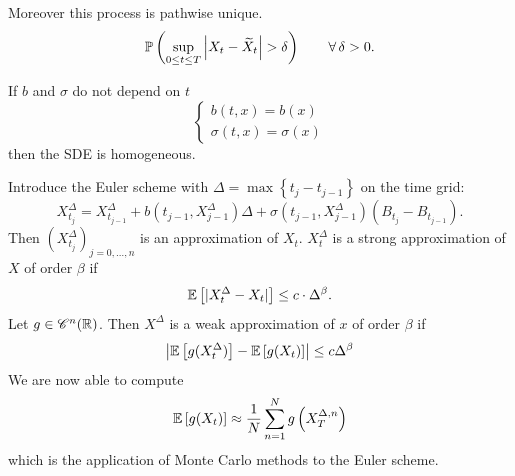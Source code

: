 \documentclass[12pt]{report}
\begin{document}
Moreover this process is pathwise unique.
\begin{equation*}
	\pr\left(\sup_{0\leq t\leq T}\left|X_{t}-\widetilde{X}_{t}\right|>\delta\right)\qquad\every\delta>0.
\end{equation*}
\begin{remark}
	If $b$ and $\sigma$ do not depend on $t$
	\begin{equation*}
		\begin{cases}
			b(t,x)=b(x)\\
			\sigma(t,x)=\sigma(x)
		\end{cases}
	\end{equation*}
	then the SDE is homogeneous.
\end{remark}
Introduce the Euler scheme with $\Delta=\max\left\{t_{j}-t_{j-1}\right\}$ on the time grid:
\begin{equation*}
	X^{\Delta}_{t_{j}}=X^{\Delta}_{t_{j-1}}+b\left(t_{j-1},X^{\Delta}_{j-1}\right)\Delta+\sigma\left(t_{j-1},X^{\Delta}_{j-1}\right)\left(B_{t_{j}}-B_{t_{j-1}}\right).
\end{equation*}
Then ${\left(X^{\Delta}_{t_{j}}\right)}_{j=0,\ldots,n}$ is an approximation of $X_{t}$. $X^{\Delta}_{t}$ is a strong approximation of $X$ of order $\beta$ if
\begin{equation*}
	\mathbb{E}\left[|X_{t}^{\Delta}-X_{t}|\right]\leq c\cdot\Delta^{\beta}.
\end{equation*} 
Let $g\in \mathscr{C}^{n}(\mathbb{R})$. Then $X^{\Delta}$ is a weak approximation of $x$ of order $\beta$ if
\begin{equation*}
	\left|\mathbb{E}\left[g(X_{t}^{\Delta})\right]-\mathbb{E}\left[g(X_{t})\right]\right|\leq c\Delta^{\beta}
\end{equation*}
We are now able to compute 
\begin{equation*}
	\mathbb{E}\left[g(X_{t})\right]\approx\frac{1}{N}\sum_{n=1}^{N}g\left(X_{T}^{\Delta,n}\right)
\end{equation*}
which is the application of Monte Carlo methods to the Euler scheme.
\end{document}
